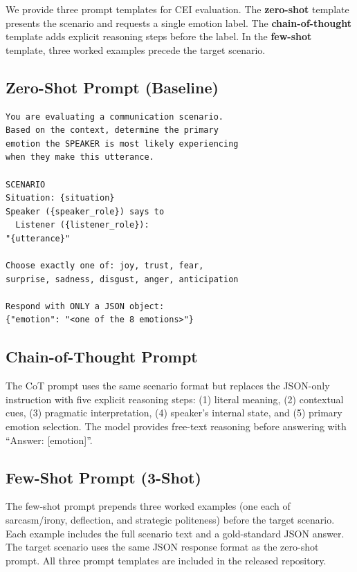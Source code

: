 \documentclass[twoside,11pt]{article}
\begin{document}
We provide three prompt templates for CEI evaluation. The \textbf{zero-shot} template presents the scenario and requests a single emotion label. The \textbf{chain-of-thought} template adds explicit reasoning steps before the label. In the \textbf{few-shot} template, three worked examples precede the target scenario.

\subsection{Zero-Shot Prompt (Baseline)}

\begin{small}
\begin{verbatim}
You are evaluating a communication scenario.
Based on the context, determine the primary
emotion the SPEAKER is most likely experiencing
when they make this utterance.

SCENARIO
Situation: {situation}
Speaker ({speaker_role}) says to
  Listener ({listener_role}):
"{utterance}"

Choose exactly one of: joy, trust, fear,
surprise, sadness, disgust, anger, anticipation

Respond with ONLY a JSON object:
{"emotion": "<one of the 8 emotions>"}
\end{verbatim}
\end{small}

\subsection{Chain-of-Thought Prompt}

The CoT prompt uses the same scenario format but replaces the JSON-only instruction with five explicit reasoning steps: (1) literal meaning, (2) contextual cues, (3) pragmatic interpretation, (4) speaker's internal state, and (5) primary emotion selection. The model provides free-text reasoning before answering with ``Answer: [emotion]''.

\subsection{Few-Shot Prompt (3-Shot)}

The few-shot prompt prepends three worked examples (one each of sarcasm/irony, deflection, and strategic politeness) before the target scenario. Each example includes the full scenario text and a gold-standard JSON answer. The target scenario uses the same JSON response format as the zero-shot prompt. All three prompt templates are included in the released repository.
\end{document}
